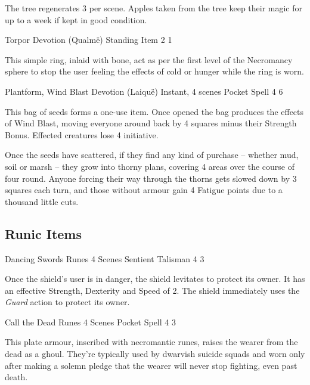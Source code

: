 \begin{multicols}{2}
The tree regenerates 3 per scene.  Apples taken from the tree keep their magic for up to a week if kept in good condition.

	{Torpor}%
	{Devotion (Qualm\"{e})}%
	{Standing}%
	{Item}%
	{2}%
	{1}\label{ring_asphyxiation}%

This simple ring, inlaid with bone, act as per the first level of the Necromancy sphere to stop the user feeling the effects of cold or hunger while the ring is worn.

	{Plantform, Wind Blast}%
	{Devotion (Laiqu\"{e})}%
	{Instant, 4 scenes}%
	{Pocket Spell}%
	{4}%
	{6}%

This bag of seeds forms a one-use item.
Once opened the bag produces the effects of Wind Blast, moving everyone around back by 4 squares minus their Strength Bonus.
Effected creatures lose 4 initiative.

Once the seeds have scattered, if they find any kind of purchase -- whether mud, soil or marsh -- they grow into thorny plans, covering 4 areas over the course of four round.
Anyone forcing their way through the thorns gets slowed down by 3 squares each turn, and those without armour gain 4 Fatigue points due to a thousand little cuts.

\subsection{Runic Items}

	{Dancing Swords}%
	{Runes}%
	{4 Scenes}%
	{Sentient Talisman}%
	{4}%
	{3}%

Once the shield's user is in danger, the shield levitates to protect its owner.
It has an effective Strength, Dexterity and Speed of 2.
The shield immediately uses the \textit{Guard} action to protect its owner.

	{Call the Dead}%
	{Runes}%
	{4 Scenes}%
	{Pocket Spell}%
	{4}%
	{3}%

\label{eternalwarriorarmour}

This plate armour, inscribed with necromantic runes, raises the wearer from the dead as a ghoul.
They're typically used by dwarvish suicide squads and worn only after making a solemn pledge that the wearer will never stop fighting, even past death.


\end{multicols}
